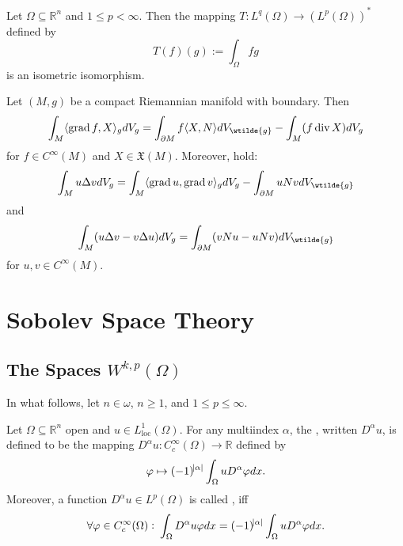 \begin{proposition}
	Let $\Omega \subseteq \mathbb{R}^n$ and $1 \leq p < \infty$. Then the mapping $T : L^q(\Omega) \to (L^p(\Omega))^*$ defined by
	\begin{equation*}
		T(f)(g) := \int_\Omega fg
	\end{equation*}
	\noindent is an isometric isomorphism.
\end{proposition}

\begin{proposition}
	\label{prop:IP}
	Let $(M,g)$ be a compact Riemannian manifold with boundary. Then
	\begin{equation*}
		\int_M \langle \grad f,X \rangle_g dV_g = \int_{\partial M}f \langle X,N \rangle dV_{\wtilde{g}} - \int_M (f \div X) dV_g
	\end{equation*}
	\noindent for $f \in C^\infty(M)$ and $X \in \mathfrak{X}(M)$. Moreover,  hold:
	\begin{equation*}
		\int_M u\Delta v dV_g = \int_M \langle \grad u,\grad v\rangle_g dV_g - \int_{\partial M} uNv dV_{\wtilde{g}}
	\end{equation*}
	\noindent and
	\begin{equation*}
		\int_M (u\Delta v - v \Delta u)dV_g = \int_{\partial M}(vNu - u Nv)dV_{\wtilde{g}}
	\end{equation*}
	\noindent for $u,v \in C^\infty(M)$.
\end{proposition}

\section*{Sobolev Space Theory}
\subsection*{The Spaces $W^{k,p}(\Omega)$}
In what follows, let $n \in \omega$, $n \geq 1$, and $1 \leq p \leq \infty$.

\begin{definition}
	Let $\Omega \subseteq \mathbb{R}^n$ open and $u \in L^1_{\mathrm{loc}}(\Omega)$. For any multiindex $\alpha$, the , written $D^\alpha u$, is defined to be the mapping $D^\alpha u : C^\infty_c(\Omega) \to \mathbb{R}$ defined by
	\begin{equation*}
		\varphi \mapsto (-1)^{\abs{\alpha}}\int_\Omega u D^\alpha \varphi dx.
	\end{equation*}
	Moreover, a function $D^\alpha u \in L^p(\Omega)$ is called , iff
	\begin{equation*}
		\forall \varphi \in C^\infty_c(\Omega): \> \int_\Omega D^\alpha u \varphi dx =  (-1)^{\abs{\alpha}} \int_\Omega u D^\alpha \varphi dx.
	\end{equation*}
\end{definition}

